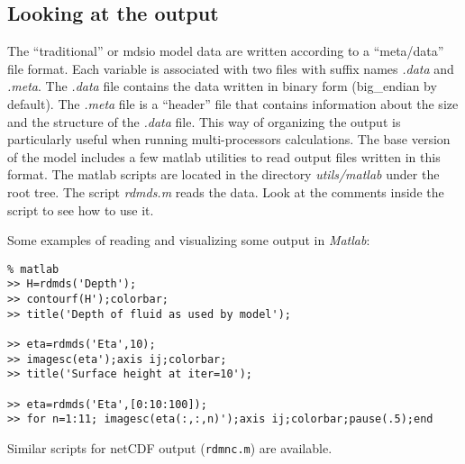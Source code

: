 \subsection{Looking at the output}

The ``traditional'' or mdsio model data are written according to a
``meta/data'' file format.  Each variable is associated with two files
with suffix names \textit{.data} and \textit{.meta}. The
\textit{.data} file contains the data written in binary form
(big\_endian by default). The \textit{.meta} file is a ``header'' file
that contains information about the size and the structure of the
\textit{.data} file. This way of organizing the output is particularly
useful when running multi-processors calculations. The base version of
the model includes a few matlab utilities to read output files written
in this format. The matlab scripts are located in the directory
\textit{utils/matlab} under the root tree. The script \textit{rdmds.m}
reads the data. Look at the comments inside the script to see how to
use it.

Some examples of reading and visualizing some output in {\em Matlab}:
\begin{verbatim}
% matlab
>> H=rdmds('Depth');
>> contourf(H');colorbar;
>> title('Depth of fluid as used by model');

>> eta=rdmds('Eta',10);
>> imagesc(eta');axis ij;colorbar;
>> title('Surface height at iter=10');

>> eta=rdmds('Eta',[0:10:100]);
>> for n=1:11; imagesc(eta(:,:,n)');axis ij;colorbar;pause(.5);end
\end{verbatim}

Similar scripts for netCDF output (\texttt{rdmnc.m}) are available.
